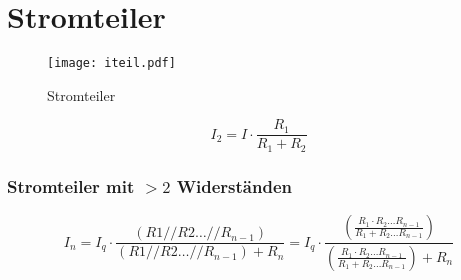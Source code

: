



\section{Stromteiler}
\begin{figure}[h!]
	\centering
	\texttt{[image: iteil.pdf]}
	\caption{Stromteiler}
	\label{sch:iteil}
\end{figure}
\[ I_2 = I \cdot \frac{R_1}{R_1 + R_2} \]

\subsubsection{Stromteiler mit $> 2$ Widerständen}
\[ I_n = I_q \cdot \frac{(R1 // R2 \dots // R_{n-1})}
{(R1 // R2 \dots // R_{n-1}) + R_n} 
= I_q \cdot \frac{\left(\frac{R_1 \cdot R_2 \dots R_{n-1}}
{R_1 + R_2 \dots R_{n-1}}\right)}
{\left(\frac{R_1 \cdot R_2 \dots R_{n-1}}
{R_1 + R_2 \dots R_{n-1}}\right) + R_n} \]